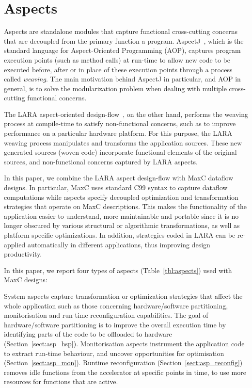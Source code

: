 \section{Aspects}
\label{sec:aspects}

Aspects are standalone modules that capture functional cross-cutting concerns
that are decoupled from the primary function a program. AspectJ~\cite{Kiczales:2001}, which is the standard language for Aspect-Oriented Programming (AOP),  captures program execution points (such as method calls) at run-time to allow new code to be executed before, after or in place of these execution points through a process called \emph{weaving}. The main motivation behind AspectJ in particular, and AOP in general, is to solve the modularization problem when dealing with multiple cross-cutting functional concerns.

The LARA aspect-oriented design-flow~\cite{Cardoso:Carvalho:Cutinho:Luk:Nobre:Diniz:Petrov:2012}, on the other hand, performs the weaving process at compile-time to satisfy non-functional concerns, such as to improve performance on a particular hardware platform. For this purpose, the LARA weaving process manipulates and transforms the application sources. These new generated sources (woven code) incorporate functional elements of the original sources, and non-functional concerns captured by LARA aspects.

In this paper, we combine the LARA aspect design-flow with MaxC dataflow designs. In particular, MaxC uses standard C99 syntax to capture dataflow computations while aspects specify decoupled optimization and transformation strategies that operate on MaxC descriptions. This makes the
functionality of the application easier to understand, more
maintainable and portable since it is no longer obscured by various
structural or algorithmic transformations, as well as platform specific
optimizations. In addition, strategies coded in LARA can be re-applied automatically in different applications, thus improving design productivity.

In this paper, we report four types of aspects (Table~\ref{tbl:aspects}) used with MaxC designs:

\vspace*{0.5ex}
 System aspects capture transformation or optimization strategies that affect the whole application such as those concerning
hardware/software partitioning, monitorisation and run-time reconfiguration
capabilities. The goal of hardware/software partitioning is to improve the overall
execution time by identifying parts of the code to be offloaded to hardware (Section~\ref{sect:asp_hsp}). Monitorisation aspects instrument the application code to extract run-time behaviour, and uncover opportunities for optimisation (Section~\ref{sect:asp_mon}). Runtime reconfiguration (Section~\ref{sect:asp_reconfig}) removes idle functions from the accelerator at specific points in time, to use more resources for functions that are active.

